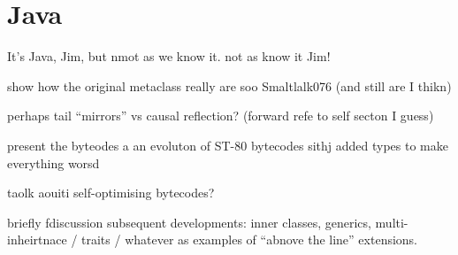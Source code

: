 \section{Java}

It's Java, Jim, but nmot as we know it.
not as know it Jim!

show how the original metaclass really are soo Smaltlalk076
(and still are I thikn)

perhaps tail ``mirrors'' vs causal reflection?
(forward refe to self secton I guess)



present the byteodes a an evoluton of ST-80 bytecodes
sithj added types to make everything worsd


taolk aouiti self-optimising bytecodes?



briefly fdiscussion subsequent developments: inner classes,
generics, multi-inheirtnace / traits / whatever
as examples of ``abnove the line'' extensions.

